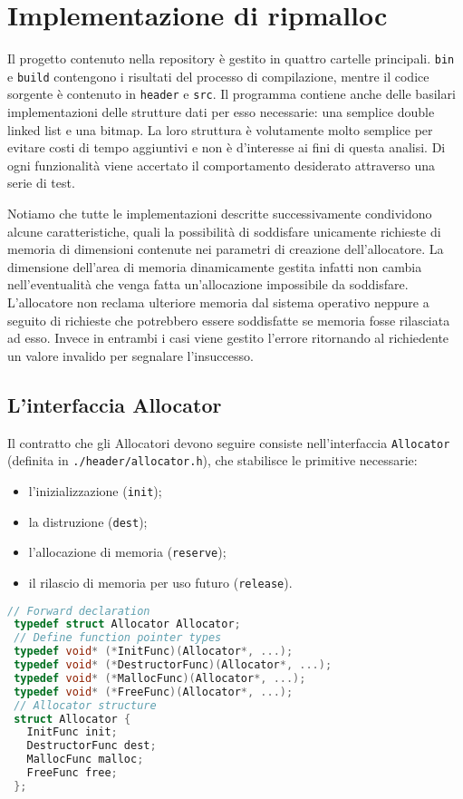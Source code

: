 \chapter{Implementazione di ripmalloc}

Il progetto contenuto nella repository è gestito in quattro cartelle principali. \texttt{bin} e \texttt{build} contengono i risultati del processo di compilazione, mentre il codice sorgente è contenuto in \texttt{header} e \texttt{src}. Il programma contiene anche delle basilari implementazioni delle strutture dati per esso necessarie: una semplice double linked list e una bitmap. La loro struttura è volutamente molto semplice per evitare costi di tempo aggiuntivi e non è d’interesse ai fini di questa analisi. Di ogni funzionalità viene accertato il comportamento desiderato attraverso una serie di test.

Notiamo che tutte le implementazioni descritte successivamente condividono alcune caratteristiche, quali la possibilità di soddisfare unicamente richieste di memoria di dimensioni contenute nei parametri di creazione dell’allocatore. La dimensione dell’area di memoria dinamicamente gestita infatti non cambia nell’eventualità che venga fatta un’allocazione impossibile da soddisfare. L’allocatore non reclama ulteriore memoria dal sistema operativo neppure a seguito di richieste che potrebbero essere soddisfatte se memoria fosse rilasciata ad esso. Invece in entrambi i casi viene gestito l’errore ritornando al richiedente un valore invalido per segnalare l’insuccesso.

\section{L’interfaccia Allocator}

Il contratto che gli Allocatori devono seguire consiste nell’interfaccia \texttt{Allocator} (definita in \texttt{./header/allocator.h}), che stabilisce le primitive necessarie:
\begin{itemize}
  \item l’inizializzazione (\texttt{init});
  \item la distruzione (\texttt{dest});
  \item l’allocazione di memoria (\texttt{reserve});
  \item il rilascio di memoria per uso futuro (\texttt{release}).
\end{itemize}

\begin{lstlisting}[language=C, caption={Definizione dell'interfaccia Allocator}]
 // Forward declaration
 typedef struct Allocator Allocator;
 // Define function pointer types
 typedef void* (*InitFunc)(Allocator*, ...);
 typedef void* (*DestructorFunc)(Allocator*, ...);
 typedef void* (*MallocFunc)(Allocator*, ...);  
 typedef void* (*FreeFunc)(Allocator*, ...);       
 // Allocator structure
 struct Allocator {
   InitFunc init; 
   DestructorFunc dest;
   MallocFunc malloc;
   FreeFunc free; 
 };
\end{lstlisting}

